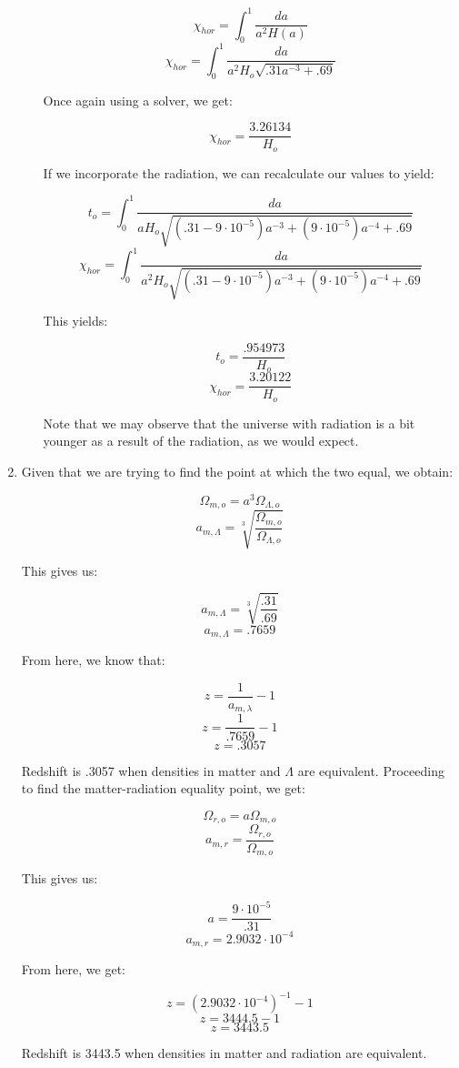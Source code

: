 \begin{enumerate}
\begin{enumerate}
        $$\chi_{hor}=\int_0^1\frac{da}{a^2H(a)}$$
        $$\chi_{hor}=\int_0^1\frac{da}{a^2H_o\sqrt{.31a^{-3}+.69}}$$

        Once again using a solver, we get:

        $$\boxed{\chi_{hor}=\frac{3.26134}{H_o}}$$

        If we incorporate the radiation, we can recalculate our values to yield:

        $$t_o=\int_0^1\frac{da}{aH_o\sqrt{(.31-9\cdot10^{-5})a^{-3}+(9\cdot10^{-5})a^{-4}+.69}}$$
        $$\chi_{hor}=\int_0^1\frac{da}{a^2H_o\sqrt{(.31-9\cdot10^{-5})a^{-3}+(9\cdot10^{-5})a^{-4}+.69}}$$

        This yields:

        $$\boxed{t_o=\frac{.954973}{H_o}}$$
        $$\boxed{\chi_{hor}=\frac{3.20122}{H_o}}$$

        Note that we may observe that the universe with radiation is a bit younger as a result of the radiation, as we would expect.

    \end{enumerate}

  \item Given that we are trying to find the point at which the two equal, we obtain:

    $$\Omega_{m,o}=a^3\Omega_{\Lambda,o}$$
    $$a_{m,\Lambda}=\sqrt[3]{\frac{\Omega_{m,o}}{\Omega_{\Lambda,o}}}$$

    This gives us:

    $$a_{m,\Lambda}=\sqrt[3]{\frac{.31}{.69}}$$
    $$\boxed{a_{m,\Lambda}=.7659}$$

    From here, we know that:

    $$z=\frac{1}{a_{m,\lambda}}-1$$
    $$z=\frac{1}{.7659}-1$$
    $$\boxed{z=.3057}$$

    Redshift is .3057 when densities in matter and $\Lambda$ are equivalent.  Proceeding to find the matter-radiation equality point, we get:

    $$\Omega_{r,o}=a\Omega_{m,o}$$
    $$a_{m,r}=\frac{\Omega_{r,o}}{\Omega_{m,o}}$$

    This gives us:

    $$a=\frac{9\cdot10^{-5}}{.31}$$
    $$\boxed{a_{m,r}=2.9032\cdot10^{-4}}$$

    From here, we get:

    $$z=(2.9032\cdot10^{-4})^{-1}-1$$
    $$z=3444.5-1$$
    $$\boxed{z=3443.5}$$

    Redshift is 3443.5 when densities in matter and radiation are equivalent.


\end{enumerate}
